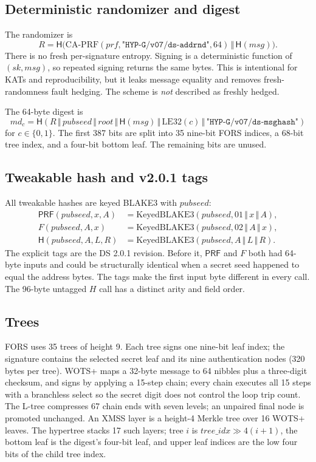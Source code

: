 \documentclass[11pt,a4paper]{article}
\theoremstyle{plain}
\theoremstyle{definition}
\theoremstyle{remark}
\newcommand{\concat}{\,\Vert\,}
\newcommand{\Hash}{\mathsf{H}}
\newcommand{\PRF}{\mathsf{PRF}}
\begin{document}
\subsection{Deterministic randomizer and digest}

The randomizer is
\[
 R=\Hash\bigl(\mathrm{CA\text{-}PRF}(\mathit{prf},
 \texttt{"HYP-G/v07/ds-addrnd"},64)\concat\Hash(\mathit{msg})\bigr).
\]
There is no fresh per-signature entropy.  Signing is a deterministic
function of $(sk,\mathit{msg})$, so repeated signing returns the same
bytes.  This is intentional for KATs and reproducibility, but it leaks
message equality and removes fresh-randomness fault hedging.  The scheme
is \emph{not} described as freshly hedged.

The 64-byte digest is
\[
 md_c=\Hash(R\concat\mathit{pubseed}\concat\mathit{root}
 \concat\Hash(\mathit{msg})\concat\mathrm{LE32}(c)
 \concat\texttt{"HYP-G/v07/ds-msghash"})
\]
for $c\in\{0,1\}$.  The first 387 bits are split into 35 nine-bit FORS
indices, a 68-bit tree index, and a four-bit bottom leaf.  The remaining
bits are unused.

\subsection{Tweakable hash and v2.0.1 tags}

All tweakable hashes are keyed BLAKE3 with $\mathit{pubseed}$:
\[
 \begin{aligned}
 \PRF(\mathit{pubseed},x,A)&=\mathrm{KeyedBLAKE3}
   (\mathit{pubseed},01\concat x\concat A),\\
 F(\mathit{pubseed},A,x)&=\mathrm{KeyedBLAKE3}
   (\mathit{pubseed},02\concat A\concat x),\\
 \Hash(\mathit{pubseed},A,L,R)&=\mathrm{KeyedBLAKE3}
   (\mathit{pubseed},A\concat L\concat R).
 \end{aligned}
\]
The explicit tags are the DS 2.0.1 revision.  Before it, $\PRF$ and
$F$ both had 64-byte inputs and could be structurally identical when a
secret seed happened to equal the address bytes.  The tags make the
first input byte different in every call.  The 96-byte untagged $H$
call has a distinct arity and field order.

\subsection{Trees}

FORS uses 35 trees of height 9.  Each tree signs one nine-bit leaf
index; the signature contains the selected secret leaf and its nine
authentication nodes (320 bytes per tree).  WOTS+ maps a 32-byte message
to 64 nibbles plus a three-digit checksum, and signs by applying a
15-step chain; every chain executes all 15 steps with a branchless
select so the secret digit does not control the loop trip count.  The
L-tree compresses 67 chain ends with seven levels; an unpaired final
node is promoted unchanged.  An XMSS layer is a height-4 Merkle tree
over 16 WOTS+ leaves.  The hypertree stacks 17 such layers; tree
$i$ is $\mathit{tree\_idx}\gg 4(i+1)$, the bottom leaf is the digest's
four-bit leaf, and upper leaf indices are the low four bits of the
child tree index.
\end{document}
